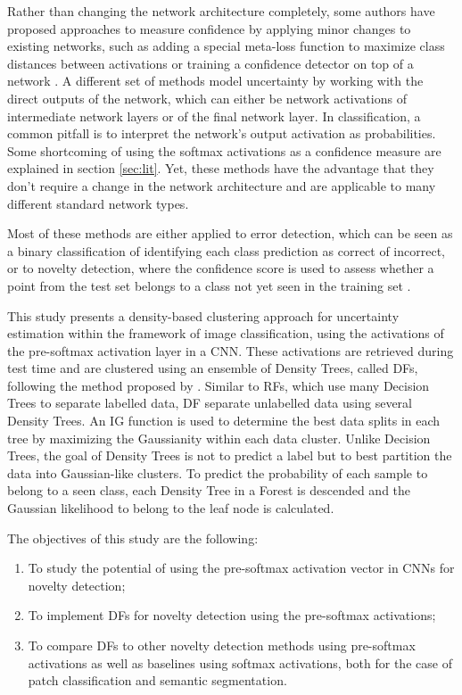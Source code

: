 \documentclass[10pt]{article}
\begin{document}
Rather than changing the network architecture completely, some authors have proposed approaches to measure confidence by applying minor changes to existing networks, such as adding a special meta-loss function to maximize class distances between activations \cite{mandelbaum17} or training a confidence detector on top of a network \cite{Bahat_2018}. A different set of methods model uncertainty by working with the direct outputs of the network, which can either be network activations of intermediate network layers or of the final network layer. In classification, a common pitfall is to interpret the network's output activation as probabilities. Some shortcoming of using the softmax activations as a confidence measure are explained in section \ref{sec:lit}. Yet, these methods have the advantage that they don't require a change in the network architecture and are applicable to many different standard network types.

Most of these methods are either applied to error detection, which can be seen as a binary classification of identifying each class prediction as correct of incorrect, or to novelty detection, where the confidence score is used to assess whether a point from the test set belongs to a class not yet seen in the training set \cite{mandelbaum17, deMorsier2014thesis}.

This study presents a density-based clustering approach for uncertainty estimation within the framework of image classification, using the activations of the pre-softmax activation layer in a CNN. These activations are retrieved during test time and are clustered using an ensemble of Density Trees, called \glspl{DF}, following the method proposed by \textcite{decisionForests-MSR}. Similar to \glspl{RF}, which use many Decision Trees to separate labelled data, \acrlong{DF} separate unlabelled data using several Density Trees. An \gls{IG} function is used to determine the best data splits in each tree by maximizing the Gaussianity within each data cluster. Unlike Decision Trees, the goal of Density Trees is not to predict a label but to best partition the data into Gaussian-like clusters. To predict the probability of each sample to belong to a seen class, each Density Tree in a Forest is descended and the Gaussian likelihood to belong to the leaf node is calculated. 

The objectives of this study are the following:
\begin{enumerate}
    \item To study the potential of using the pre-softmax activation vector in \glspl{CNN} for novelty detection;
    \item To implement \glspl{DF} for novelty detection using the pre-softmax activations;
    \item To compare \glspl{DF} to other novelty detection methods using pre-softmax activations as well as baselines using softmax activations, both for the case of patch classification and semantic segmentation.
\end{enumerate}
\end{document}
